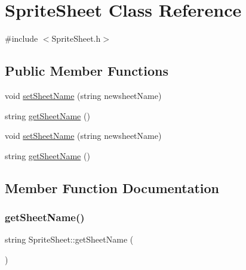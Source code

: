 \hypertarget{classSpriteSheet}{}\section{Sprite\+Sheet Class Reference}
\label{classSpriteSheet}


{\ttfamily \#include $<$Sprite\+Sheet.\+h$>$}

\subsection*{Public Member Functions}
\begin{DoxyCompactItemize}
\item 
void \hyperlink{classSpriteSheet_ab635dd55f278dc207b00b709b951709f}{set\+Sheet\+Name} (string newsheet\+Name)
\item 
string \hyperlink{classSpriteSheet_ad06ca62e3dc2a880a6741e8dd26e6134}{get\+Sheet\+Name} ()
\item 
void \hyperlink{classSpriteSheet_ab635dd55f278dc207b00b709b951709f}{set\+Sheet\+Name} (string newsheet\+Name)
\item 
string \hyperlink{classSpriteSheet_ad06ca62e3dc2a880a6741e8dd26e6134}{get\+Sheet\+Name} ()
\end{DoxyCompactItemize}


\subsection{Member Function Documentation}
\mbox{\label{classSpriteSheet_ad06ca62e3dc2a880a6741e8dd26e6134}} 
\subsubsection{\texorpdfstring{get\+Sheet\+Name()}{getSheetName()}\hspace{0.1cm}{\footnotesize\ttfamily [1/2]}}
{\footnotesize\ttfamily string Sprite\+Sheet\+::get\+Sheet\+Name (\begin{DoxyParamCaption}{ }\end{DoxyParamCaption})}

\mbox{\label{classSpriteSheet_ad06ca62e3dc2a880a6741e8dd26e6134}} 
